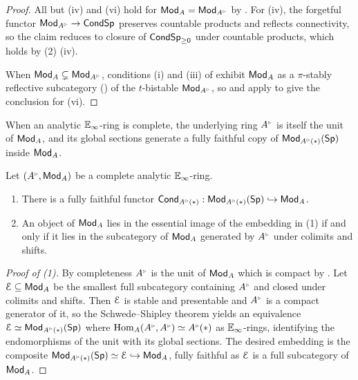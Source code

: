 \begin{proof}
    All but (iv) and (vi) hold for $\Mod_{A}=\Mod_{A^{\tri}}$ by \cite[Prop. 2.1.1.1, War. 2.1.1.2, \& Rmk. 2.1.2.1]{SAG}. For (iv), the forgetful functor $\Mod_{A^{\tri}}\to\Cond\Sp$ preserves countable products and reflects connectivity, so the claim reduces to closure of $\mathsf{Cond}\mathsf{Sp}_{\geq0}$ under countable products, which holds by  (2) (iv). 

    When $\Mod_{A}\subsetneq\Mod_{A^{\tri}}$, conditions (i) and (iii) of  exhibit $\mathsf{Mod}_{A}$ as a $\pi$-stably reflective subcategory () of the $t$-bistable $\Mod_{A^{\tri}}$, so  and  apply to give the conclusion for (vi). 
\end{proof}
When an analytic $\mathbb{E}_{\infty}$-ring is complete, the underlying ring $A^{\tri}$ is itself the unit of $\mathsf{Mod}_{A}$, and its global sections generate a fully faithful copy of $\Mod_{A^{\tri}(*)}(\Sp)$ inside $\mathsf{Mod}_{A}$.
\begin{proposition}\label{prop: discrete modules}
    Let $(A^{\tri},\Mod_{A})$ be a complete analytic $\mathbb{E}_{\infty}$-ring. 
    \begin{enumerate}
        \item There is a fully faithful functor $\Cond_{A^{\tri}(*)}:\Mod_{A^{\tri}(*)}(\Sp)\hookrightarrow\Mod_{A}$. 
        \item An object of $\mathsf{Mod}_{A}$ lies in the essential image of the embedding in (1) if and only if it lies in the subcategory of $\mathsf{Mod}_{A}$ generated by $A^{\tri}$ under colimits and shifts. 
    \end{enumerate} 
\end{proposition}
\begin{proof}[Proof of (1)]
    By completeness $A^{\tri}$ is the unit of $\mathsf{Mod}_{A}$ which is compact by . Let $\EuScript{E}\subseteq\mathsf{Mod}_{A}$ be the smallest full subcategory containing $A^{\tri}$ and closed under colimits and shifts. Then $\EuScript{E}$ is stable and presentable and $A^{\tri}$ is a compact generator of it, so the Schwede--Shipley theorem \cite[Prop. 7.1.2.7]{HA} yields an equivalence $\Escr\simeq\Mod_{A^{\tri}(*)}(\Sp)$ where $\Hom_{A}(A^{\tri},A^{\tri})\simeq A^{\tri}(*)$ as $\mathbb{E}_{\infty}$-rings, identifying the endomorphisms of the unit with its global sections. The desired embedding is the composite $\Mod_{A^{\tri}(*)}(\Sp)\simeq\Escr\hookrightarrow\Mod_{A}$, fully faithful as $\EuScript{E}$ is a full subcategory of $\mathsf{Mod}_{A}$. 
\end{proof}
